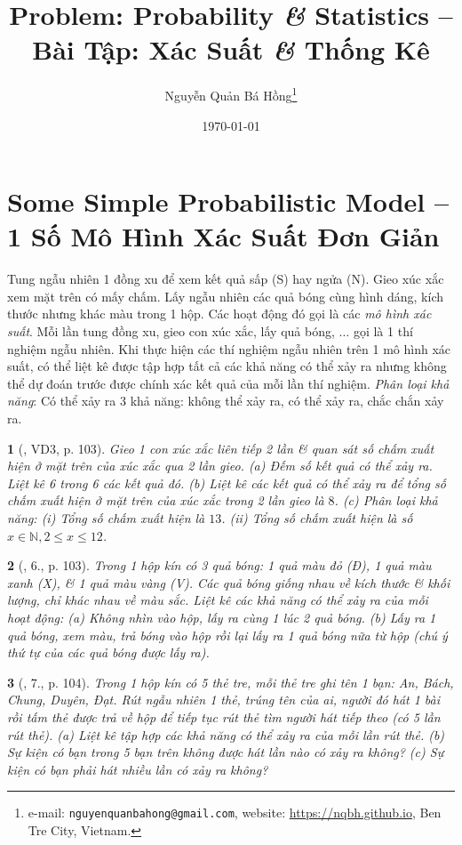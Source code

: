 \documentclass{article}
\title{Problem: Probability {\it\&} Statistics -- Bài Tập: Xác Suất {\it\&} Thống Kê}
\author{Nguyễn Quản Bá Hồng\footnote{e-mail: \texttt{nguyenquanbahong@gmail.com}, website: \url{https://nqbh.github.io}, Ben Tre City, Vietnam.}}
\date{\today}
\newtheorem{baitoan}{}
\begin{document}
\maketitle
\tableofcontents


\section{Some Simple Probabilistic Model -- 1 Số Mô Hình Xác Suất Đơn Giản}
 Tung ngẫu nhiên 1 đồng xu để xem kết quả sấp (S) hay ngửa (N). Gieo xúc xắc xem mặt trên có mấy chấm. Lấy ngẫu nhiên các quả bóng cùng hình dáng, kích thước nhưng khác màu trong 1 hộp. Các hoạt động đó gọi là các \textit{mô hình xác suất}. Mỗi lần tung đồng xu, gieo con xúc xắc, lấy quả bóng, $\ldots$ gọi là 1 thí nghiệm ngẫu nhiên.  Khi thực hiện các thí nghiệm ngẫu nhiên trên 1 mô hình xác suất, có thể liệt kê được tập hợp tất cả các khả năng có thể xảy ra nhưng không thể dự đoán trước được chính xác kết quả của mỗi lần thí nghiệm. \textit{Phân loại khả năng}: Có thể xảy ra 3 khả năng: không thể xảy ra, có thể xảy ra, chắc chắn xảy ra.

\begin{baitoan}[\cite{Tuyen_Toan_6}, VD3, p. 103]
	Gieo 1 con xúc xắc liên tiếp 2 lần \& quan sát số chấm xuất hiện ở mặt trên của xúc xắc qua 2 lần gieo. (a) Đếm số kết quả có thể xảy ra. Liệt kê 6 trong 6 các kết quả đó. (b) Liệt kê các kết quả có thể xảy ra để tổng số chấm xuất hiện ở mặt trên của xúc xắc trong 2 lần gieo là $8$. (c) Phân loại khả năng: (i) Tổng số chấm xuất hiện là $13$. (ii) Tổng số chấm xuất hiện là số $x\in\mathbb{N},2\le x\le12$.
\end{baitoan}

\begin{baitoan}[\cite{Tuyen_Toan_6}, 6., p. 103]
	Trong 1 hộp kín có 3 quả bóng: 1 quả màu đỏ (Đ), 1 quả màu xanh (X), \& 1 quả màu vàng (V). Các quả bóng giống nhau về kích thước \& khối lượng, chỉ khác nhau về màu sắc. Liệt kê các khả năng có thể xảy ra của mỗi hoạt động: (a) Không nhìn vào hộp, lấy ra cùng 1 lúc 2 quả bóng. (b) Lấy ra 1 quả bóng, xem màu, trả bóng vào hộp rồi lại lấy ra 1 quả bóng nữa từ hộp (chú ý thứ tự của các quả bóng được lấy ra).
\end{baitoan}

\begin{baitoan}[\cite{Tuyen_Toan_6}, 7., p. 104]
	Trong 1 hộp kín có 5 thẻ tre, mỗi thẻ tre ghi tên 1 bạn: An, Bách, Chung, Duyên, Đạt. Rút ngẫu nhiên 1 thẻ, trúng tên của ai, người đó hát 1 bài rồi tấm thẻ được trả về hộp để tiếp tục rút thẻ tìm người hát tiếp theo (có 5 lần rút thẻ). (a) Liệt kê tập hợp các khả năng có thể xảy ra của mỗi lần rút thẻ. (b) Sự kiện có bạn trong 5 bạn trên không được hát lần nào có xảy ra không? (c) Sự kiện có bạn phải hát nhiều lần có xảy ra không?
\end{baitoan}
\end{document}
